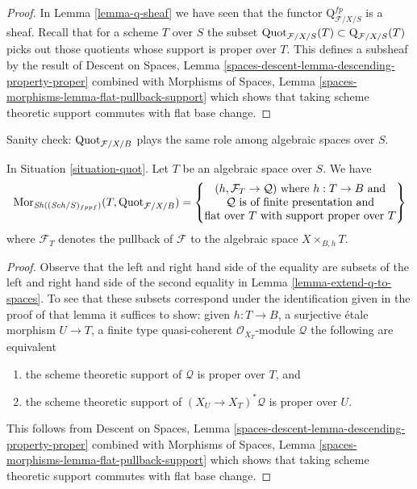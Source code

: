 \begin{proof}
In Lemma \ref{lemma-q-sheaf} we have seen that the functor
$\text{Q}^{fp}_{\mathcal{F}/X/S}$ is a sheaf. Recall that for a
scheme $T$ over $S$ the subset
$\mathrm{Quot}_{\mathcal{F}/X/S}(T) \subset \text{Q}_{\mathcal{F}/X/S}(T)$
picks out those quotients whose support is proper over $T$.
This defines a subsheaf by the result of
Descent on Spaces, Lemma \ref{spaces-descent-lemma-descending-property-proper}
combined with
Morphisms of Spaces, Lemma \ref{spaces-morphisms-lemma-flat-pullback-support}
which shows that taking scheme theoretic support commutes
with flat base change.
\end{proof}

\noindent
Sanity check: $\mathrm{Quot}_{\mathcal{F}/X/B}$
plays the same role among algebraic spaces
over $S$.

\begin{lemma}
\label{lemma-extend-quot-to-spaces}
In Situation \ref{situation-quot}. Let $T$ be an algebraic space over $S$.
We have
$$
\mathop{\mathrm{Mor}}\nolimits_{\mathop{\mathit{Sh}}\nolimits((\mathit{Sch}/S)_{fppf})}(T,  \mathrm{Quot}_{\mathcal{F}/X/B}) =
\left\{
\begin{matrix}
(h, \mathcal{F}_T \to \mathcal{Q}) \text{ where }
h : T \to B \text{ and}\\
\mathcal{Q}\text{ is of finite presentation and}\\
\text{flat over }T\text{ with support proper over }T
\end{matrix}
\right\}
$$
where $\mathcal{F}_T$ denotes the pullback of $\mathcal{F}$
to the algebraic space $X \times_{B, h} T$.
\end{lemma}

\begin{proof}
Observe that the left and right hand side of the equality are
subsets of the left and right hand side of the second equality in
Lemma \ref{lemma-extend-q-to-spaces}.
To see that these subsets correspond under
the identification given in the proof of that lemma
it suffices to show: given $h : T \to B$,
a surjective \'etale morphism $U \to T$,
a finite type quasi-coherent $\mathcal{O}_{X_T}$-module $\mathcal{Q}$
the following are equivalent
\begin{enumerate}
\item the scheme theoretic support of $\mathcal{Q}$ is proper
over $T$, and
\item the scheme theoretic support of $(X_U \to X_T)^*\mathcal{Q}$
is proper over $U$.
\end{enumerate}
This follows from
Descent on Spaces, Lemma \ref{spaces-descent-lemma-descending-property-proper}
combined with
Morphisms of Spaces, Lemma \ref{spaces-morphisms-lemma-flat-pullback-support}
which shows that taking scheme theoretic support commutes
with flat base change.
\end{proof}

